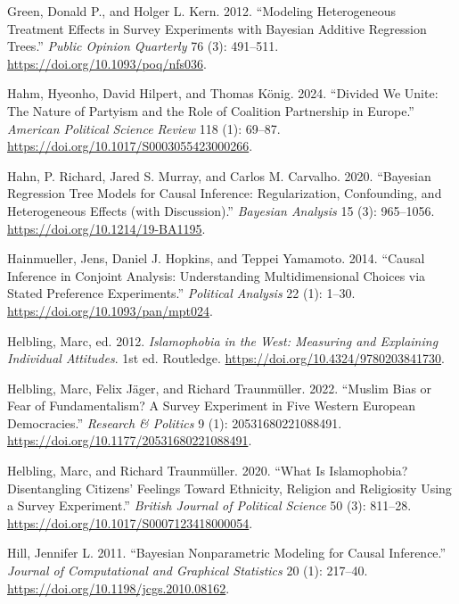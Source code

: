 \documentclass[
  10pt,
  a4paper,
  DIV=11,
  numbers=noendperiod]{scrartcl}
\newlength{\cslhangindent}
\newenvironment{CSLReferences}[2] %
 {\begin{list}{}{%
  \setlength{\itemindent}{0pt}
  \setlength{\leftmargin}{0pt}
  \setlength{\parsep}{0pt}
  \ifodd #1
   \setlength{\leftmargin}{\cslhangindent}
   \setlength{\itemindent}{-1\cslhangindent}
  \fi
  \setlength{\itemsep}{#2\baselineskip}}}
 {\end{list}}
\begin{document}
\begin{CSLReferences}{1}{1}
Green, Donald P., and Holger L. Kern. 2012. {``Modeling Heterogeneous
Treatment Effects in Survey Experiments with Bayesian Additive
Regression Trees.''} \emph{Public Opinion Quarterly} 76 (3): 491--511.
\url{https://doi.org/10.1093/poq/nfs036}.

Hahm, Hyeonho, David Hilpert, and Thomas König. 2024. {``Divided We
Unite: The Nature of Partyism and the Role of Coalition Partnership in
Europe.''} \emph{American Political Science Review} 118 (1): 69--87.
\url{https://doi.org/10.1017/S0003055423000266}.

Hahn, P. Richard, Jared S. Murray, and Carlos M. Carvalho. 2020.
{``Bayesian Regression Tree Models for Causal Inference: Regularization,
Confounding, and Heterogeneous Effects (with Discussion).''}
\emph{Bayesian Analysis} 15 (3): 965--1056.
\url{https://doi.org/10.1214/19-BA1195}.

Hainmueller, Jens, Daniel J. Hopkins, and Teppei Yamamoto. 2014.
{``Causal Inference in Conjoint Analysis: Understanding Multidimensional
Choices via Stated Preference Experiments.''} \emph{Political Analysis}
22 (1): 1--30. \url{https://doi.org/10.1093/pan/mpt024}.

Helbling, Marc, ed. 2012. \emph{Islamophobia in the West: Measuring and
Explaining Individual Attitudes}. 1st ed. Routledge.
\url{https://doi.org/10.4324/9780203841730}.

Helbling, Marc, Felix Jäger, and Richard Traunmüller. 2022. {``Muslim
Bias or Fear of Fundamentalism? A Survey Experiment in Five Western
European Democracies.''} \emph{Research \& Politics} 9 (1):
20531680221088491. \url{https://doi.org/10.1177/20531680221088491}.

Helbling, Marc, and Richard Traunmüller. 2020. {``What Is Islamophobia?
Disentangling Citizens' Feelings Toward Ethnicity, Religion and
Religiosity Using a Survey Experiment.''} \emph{British Journal of
Political Science} 50 (3): 811--28.
\url{https://doi.org/10.1017/S0007123418000054}.

Hill, Jennifer L. 2011. {``Bayesian Nonparametric Modeling for Causal
Inference.''} \emph{Journal of Computational and Graphical Statistics}
20 (1): 217--40. \url{https://doi.org/10.1198/jcgs.2010.08162}.


\end{CSLReferences}
\end{document}
